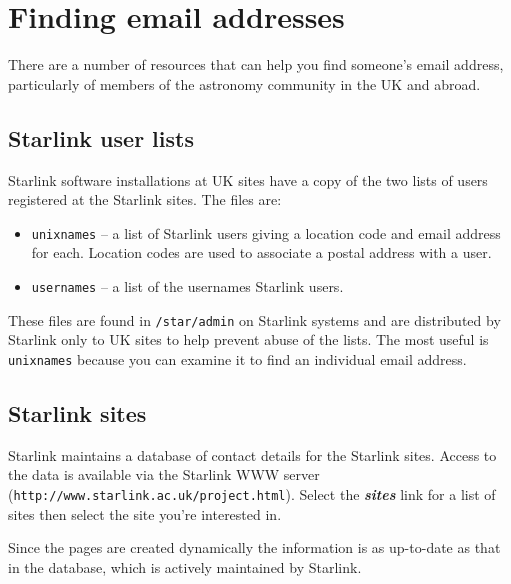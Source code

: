 \documentclass[twoside,11pt]{article}
\newcommand{\htmladdnormallink}[2]{#1}
\newcommand{\latex}[1]{#1}
\newcommand{\xlabel}[1]{}
\renewcommand{\_}{\texttt{\symbol{95}}}
\begin{document}
\section{\xlabel{finding_email_addresses}Finding email addresses}
\label{finding_email_addresses}

There are a number of resources that can help you find someone's email
address, particularly of members of the astronomy community in the UK and
abroad.

\subsection{\xlabel{starlink_user_lists}Starlink user lists}
Starlink software installations at UK sites have a copy of the two lists
of users registered at the Starlink sites.  The files are:

\begin{itemize}

\item \texttt{unixnames} -- a list of Starlink users giving a location
code and email address for each.  Location codes are used to associate
a postal address with a user.

\item \texttt{usernames} -- a list of the usernames Starlink users.

\end{itemize}

These files are found in \texttt{/star/admin} on Starlink systems and
are distributed by Starlink only to UK sites to help prevent abuse of
the lists.  The most useful is \texttt{unixnames} because you can
examine it to find an individual email address.

\subsection{\xlabel{starlink_sites}Starlink sites}
\label{starlink_sites}

Starlink maintains a database of contact details for the Starlink
sites.  Access to the data is available via the
\htmladdnormallink{Starlink WWW
server}{http://www.starlink.ac.uk/project.html}
\latex{(\texttt{http://www.starlink.ac.uk/project.html})}.
Select the \textbf{\textit{sites}} link for a list of sites then select
the site you're interested in.

Since the pages are created dynamically the information is as
up-to-date as that in the database, which is actively maintained by
Starlink.
\end{document}
